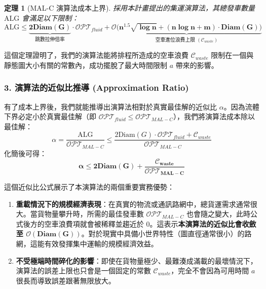 \documentclass{article}
\newtheorem{theorem}{定理}
\begin{document}
\begin{theorem}[MAL-C 演算法成本上界]
採用本計畫提出的集運演算法，其總發車數量 $\text{ALG}$ 會滿足以下限制：
\begin{equation}
    \text{ALG} \le \underbrace{\mathbf{2\text{Diam}(G)}}_{\text{跳數拉伸倍率}} \cdot \mathcal{OPT}_{fluid} + \underbrace{\mathbf{\mathcal{O} \Big( n^{1.5}\sqrt{\log n} + (n \log n + m) \cdot \text{Diam}(G) \Big)}}_{\text{空車進位浪費上限 } (\mathcal{C}_{waste})}
\end{equation}
\end{theorem}
這個定理證明了，我們的演算法能將排程所造成的空車浪費 $\mathcal{C}_{waste}$ 限制在一個與靜態圖大小有關的常數內，成功擺脫了最大時間限制 $a$ 帶來的影響。

\subsubsection*{3. 演算法的近似比推導 (Approximation Ratio)}

有了成本上界後，我們就能推導出演算法相對於真實最佳解的近似比 $\alpha$。因為流體下界必定小於真實最佳解（即 $\mathcal{OPT}_{fluid} \le \mathcal{OPT}_{MAL-C}$），我們將演算法成本除以最佳解：
\begin{equation}
    \alpha = \frac{\text{ALG}}{\mathcal{OPT}_{MAL-C}} \le \frac{2\text{Diam}(G) \cdot \mathcal{OPT}_{fluid} + \mathcal{C}_{waste}}{\mathcal{OPT}_{MAL-C}}
\end{equation}
化簡後可得：
\begin{equation}
    \mathbf{\alpha \le 2\text{Diam}(G) + \frac{\mathcal{C}_{waste}}{\mathcal{OPT}_{MAL-C}}}
\end{equation}

這個近似比公式展示了本演算法的兩個重要實務優勢：
\begin{enumerate}[noitemsep]
    \item \textbf{重載情況下的規模經濟表現}：在真實的物流或通訊路網中，總貨運需求通常很大。當貨物量攀升時，所需的最佳發車數 $\mathcal{OPT}_{MAL-C}$ 也會隨之變大，此時公式後方的空車浪費項就會被稀釋並趨近於 $0$。這表示\textbf{本演算法的近似比會收斂至 $\mathbf{\mathcal{O}(\text{Diam}(G))}$}。對於現實中具備小世界特性（圖直徑通常很小）的路網，這能有效發揮集中運輸的規模經濟效益。
    \item \textbf{不受極端時間碎化的影響}：即使在貨物量極少、最難湊成滿載的最壞情況下，演算法的誤差上限也只會是一個固定的常數 $\mathcal{C}_{waste}$，完全不會因為可用時間 $a$ 很長而導致誤差跟著無限放大。
\end{enumerate}
\end{document}
